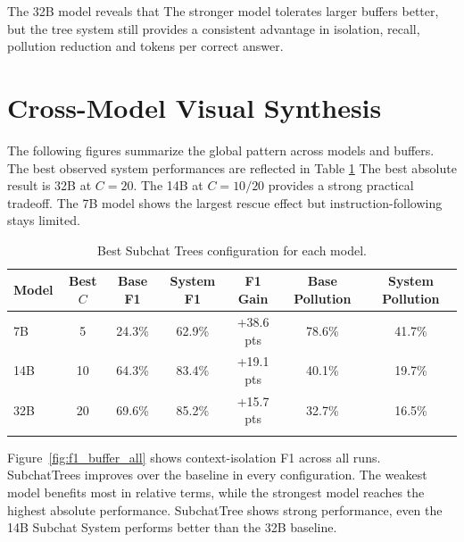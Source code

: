 The 32B model reveals that The stronger model tolerates larger buffers better, but the tree system still provides a consistent advantage in isolation, recall, pollution reduction and tokens per correct answer.







\section{Cross-Model Visual Synthesis}\label{subsec:cross_model_visuals}

 The following figures summarize the global pattern across models and buffers. The best observed system performances are reflected in Table \ref{tab:best_by_model} The best absolute result is 32B at $C=20$. The 14B at $C=10/20$ provides a strong practical tradeoff. The 7B model shows the largest rescue effect but instruction-following stays limited.

\begin{table}[htbp]
\caption{Best Subchat Trees configuration for each model.}\label{tab:best_by_model}
\centering
\scriptsize
\begin{tabular*}{\textwidth}{@{\extracolsep\fill}lcccccc@{}}
\toprule
\textbf{Model} & \textbf{Best $C$} & \textbf{Base F1} & \textbf{System F1} & \textbf{F1 Gain} & \textbf{Base Pollution} & \textbf{System Pollution} \\
\midrule
7B & 5 & 24.3\% & 62.9\% & +38.6 pts & 78.6\% & 41.7\% \\
14B & 10 & 64.3\% & 83.4\% & +19.1 pts & 40.1\% & 19.7\% \\
32B & 20 & 69.6\% & 85.2\% & +15.7 pts & 32.7\% & 16.5\% \\
\botrule
\end{tabular*}
\end{table}

Figure~\ref{fig:f1_buffer_all} shows context-isolation F1 across all runs. SubchatTrees improves over the baseline in every configuration. The weakest model benefits most in relative terms, while the strongest model reaches the highest absolute performance. SubchatTree shows strong performance, even the 14B Subchat System performs better than the 32B baseline.

